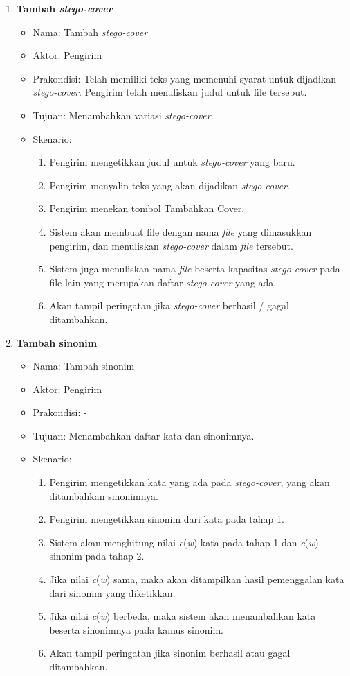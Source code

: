 \begin{enumerate}
	\item \textbf{Tambah \textit{stego-cover}}
	\begin{itemize}
		\item Nama: Tambah \textit{stego-cover}
		\item Aktor: Pengirim
		\item Prakondisi: Telah memiliki teks yang memenuhi syarat untuk dijadikan \textit{stego-cover}. Pengirim telah menuliskan judul untuk file tersebut.
		\item Tujuan: Menambahkan variasi \textit{stego-cover}.
		\item Skenario:
		\renewcommand{\labelenumii}{\arabic{enumii}.}
			\begin{enumerate}
				\item Pengirim mengetikkan judul untuk \textit{stego-cover} yang baru.			
				\item Pengirim menyalin teks yang akan dijadikan \textit{stego-cover}.
				\item Pengirim menekan tombol Tambahkan Cover.
				\item Sistem akan membuat file dengan nama \textit{file} yang dimasukkan pengirim, dan menuliskan \textit{stego-cover} dalam \textit{file} tersebut.
				\item Sistem juga menuliskan nama \textit{file} beserta kapasitas \textit{stego-cover} pada file lain yang merupakan daftar \textit{stego-cover} yang ada.
				\item Akan tampil peringatan jika \textit{stego-cover} berhasil / gagal ditambahkan.
			\end{enumerate}
	\end{itemize}
	
	\item \textbf{Tambah sinonim}
	\begin{itemize}
		\item Nama: Tambah sinonim
		\item Aktor: Pengirim
		\item Prakondisi: -
		\item Tujuan: Menambahkan daftar kata dan sinonimnya.
		\item Skenario:
		\renewcommand{\labelenumii}{\arabic{enumii}.}
			\begin{enumerate}
				\item Pengirim mengetikkan kata yang ada pada \textit{stego-cover}, yang akan ditambahkan sinonimnya.
				\item Pengirim mengetikkan sinonim dari kata pada tahap 1.
				\item Sistem akan menghitung nilai \textit{c}(\textit{w}) kata pada tahap 1 dan \textit{c}(\textit{w}) sinonim pada tahap 2.
				\item Jika nilai \textit{c}(\textit{w}) sama, maka akan ditampilkan hasil pemenggalan kata dari sinonim yang diketikkan.
				\item Jika nilai \textit{c}(\textit{w}) berbeda, maka sistem akan menambahkan kata beserta sinonimnya pada kamus sinonim.
				\item Akan tampil peringatan jika sinonim berhasil atau gagal ditambahkan.
			\end{enumerate}
	\end{itemize}
	

\end{enumerate}
